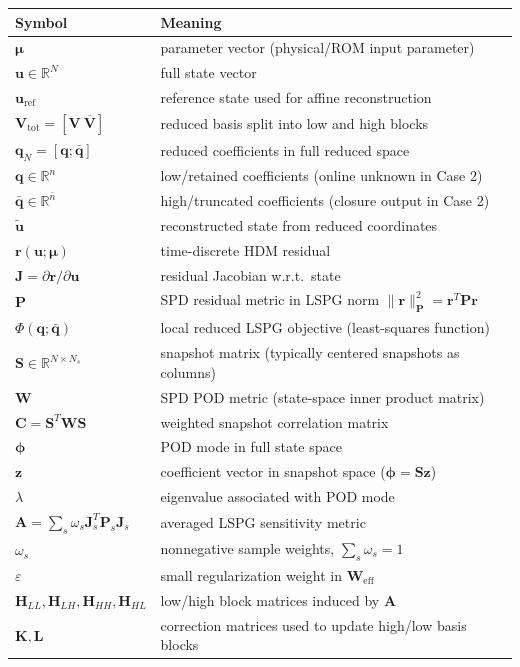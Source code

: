 \documentclass[11pt]{article}
\begin{document}
\begin{center}
\small
\begin{tabular}{@{}ll@{}}
\toprule
Symbol & Meaning \\
\midrule
$\bm\mu$ & parameter vector (physical/ROM input parameter) \\
$\mathbf u\in\mathbb R^N$ & full state vector \\
$\mathbf u_{\mathrm{ref}}$ & reference state used for affine reconstruction \\
$\mathbf V_{\mathrm{tot}}=[\mathbf V\ \overline{\mathbf V}]$ & reduced basis split into low and high blocks \\
$\mathbf q_N=[\mathbf q;\bar{\mathbf q}]$ & reduced coefficients in full reduced space \\
$\mathbf q\in\mathbb R^n$ & low/retained coefficients (online unknown in Case 2) \\
$\bar{\mathbf q}\in\mathbb R^{\bar n}$ & high/truncated coefficients (closure output in Case 2) \\
$\tilde{\mathbf u}$ & reconstructed state from reduced coordinates \\
$\mathbf r(\mathbf u;\bm\mu)$ & time-discrete HDM residual \\
$\mathbf J=\partial \mathbf r/\partial \mathbf u$ & residual Jacobian w.r.t.\ state \\
$\mathbf P$ & SPD residual metric in LSPG norm $\|\mathbf r\|_{\mathbf P}^2=\mathbf r^T\mathbf P\mathbf r$ \\
$\Phi(\mathbf q;\bar{\mathbf q})$ & local reduced LSPG objective (least-squares function) \\
$\mathbf S\in\mathbb R^{N\times N_s}$ & snapshot matrix (typically centered snapshots as columns) \\
$\mathbf W$ & SPD POD metric (state-space inner product matrix) \\
$\mathbf C=\mathbf S^T\mathbf W\mathbf S$ & weighted snapshot correlation matrix \\
$\bm\phi$ & POD mode in full state space \\
$\mathbf z$ & coefficient vector in snapshot space ($\bm\phi=\mathbf S\mathbf z$) \\
$\lambda$ & eigenvalue associated with POD mode \\
$\mathbf A=\sum_s\omega_s\mathbf J_s^T\mathbf P_s\mathbf J_s$ & averaged LSPG sensitivity metric \\
$\omega_s$ & nonnegative sample weights, $\sum_s\omega_s=1$ \\
$\varepsilon$ & small regularization weight in $\mathbf W_{\mathrm{eff}}$ \\
$\mathbf H_{LL},\mathbf H_{LH},\mathbf H_{HH},\mathbf H_{HL}$ & low/high block matrices induced by $\mathbf A$ \\
$\mathbf K,\mathbf L$ & correction matrices used to update high/low basis blocks \\
\bottomrule
\end{tabular}
\end{center}
\end{document}
